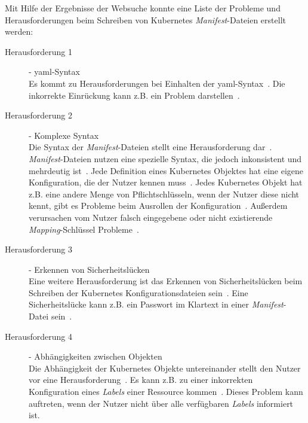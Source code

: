 Mit Hilfe der Ergebnisse der Websuche konnte eine Liste der Probleme und Herausforderungen beim Schreiben von Kubernetes \textit{Manifest}-Dateien erstellt werden:
\begin{description}
    \item[Herausforderung 1]{- \ac{yaml}-Syntax\\}
          Es kommt zu Herausforderungen bei Einhalten der \ac{yaml}-Syntax~\cite{10.1145/3357223.3365759,the-chief-io-kubernetes-challenges,techtarget-kubernetes-challenges,monokle-kubernetes-challenges}.
          Die inkorrekte Einrückung kann z.B. ein Problem darstellen~\cite{10.1145/3357223.3365759,monokle-kubernetes-challenges}.
    \item[Herausforderung 2]{- Komplexe Syntax\\}
          Die Syntax der \textit{Manifest}-Dateien stellt eine Herausforderung dar~\cite{dev-to-kubernetes-challenges,kubetools-io-kubernetes-manifest-management,entwickler-de-kubernetes-problems,newstack-io-kubernetes-manifest-lifecycle,10.1145/3357223.3365759,techtarget-kubernetes-challenges,monokle-kubernetes-challenges,kubernetes-config-problems}.
          \textit{Manifest}-Dateien nutzen eine spezielle Syntax, die jedoch inkonsistent und mehrdeutig ist~\cite{dev-to-kubernetes-challenges}.
          Jede Definition eines Kubernetes Objektes hat eine eigene Konfiguration, die der Nutzer kennen muss~\cite{kubetools-io-kubernetes-manifest-management,entwickler-de-kubernetes-problems}.
          Jedes Kubernetes Objekt hat z.B. eine andere Menge von Pflichtschlüsseln, wenn der Nutzer diese nicht kennt, gibt es Probleme beim Ausrollen der Konfiguration~\cite{10.1145/3357223.3365759, techtarget-kubernetes-challenges}.
          Außerdem verursachen vom Nutzer falsch eingegebene oder nicht existierende \textit{Mapping}-Schlüssel Probleme~\cite{monokle-kubernetes-challenges}.
    \item[Herausforderung 3]{- Erkennen von Sicherheitslücken\\}
          Eine weitere Herausforderung ist das Erkennen von Sicherheitslücken beim Schreiben der Kubernetes Konfigurationsdateien sein~\cite{9476056,dynatrace-kubernetes-security-challenges,10.1145/3468264.3473495,10.1145/3579639}.
          Eine Sicherheitslücke kann z.B. ein Passwort im Klartext in einer \textit{Manifest}-Datei sein~\cite{10.1145/3579639}.
    \item[Herausforderung 4]{- Abhängigkeiten zwischen Objekten\\}
          Die Abhängigkeit der Kubernetes Objekte untereinander stellt den Nutzer vor eine Herausforderung~\cite{dev-to-kubernetes-challenges,kubetools-io-kubernetes-manifest-management,spacelift-io-kubernetes-challenges,qovery-kubernetes-challenges}.
          Es kann z.B. zu einer inkorrekten Konfiguration eines \textit{Labels} einer Ressource kommen~\cite{spacelift-io-kubernetes-challenges,qovery-kubernetes-challenges}.
          Dieses Problem kann auftreten, wenn der Nutzer nicht über alle verfügbaren \textit{Labels} informiert ist.
\end{description}

